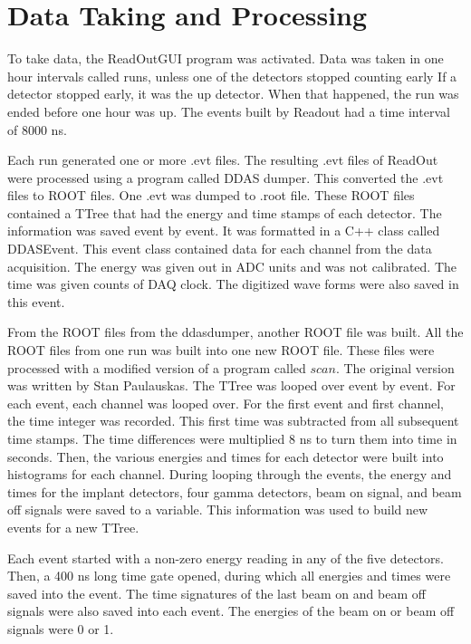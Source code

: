 \documentclass[main.tex]{subfiles}
\begin{document}
\section{Data Taking and Processing}
To take data, the ReadOutGUI program was activated. 
Data was taken in one hour intervals called runs, unless one of the detectors stopped counting early
If a detector stopped early, it was the up detector.
When that happened, the run was ended before one hour was up. 
The events built by Readout had a time interval of 8000 ns.

Each run generated one or more .evt files. 
The resulting .evt files of ReadOut were processed using a program called DDAS dumper.
This converted the .evt files to ROOT files.
One .evt was dumped to .root file. 
These ROOT files contained a TTree that had the energy and time stamps of each detector.
The information was saved event by event. 
It was formatted in a C++ class called DDASEvent. 
This event class contained data for each channel from the data acquisition.
The energy was given out in ADC units and was not calibrated.
The time was given counts of DAQ clock.
The digitized wave forms were also saved in this event. 

From the ROOT files from the ddasdumper, another ROOT file was built.
All the ROOT files from one run was built into one new ROOT file. 
These files were processed with a modified version of a program called $scan$.
The original version was written by Stan Paulauskas.
The TTree was looped over event by event.
For each event, each channel was looped over. 
For the first event and first channel, the time integer was recorded. 
This first time was subtracted from all subsequent time stamps.
The time differences were multiplied 8 ns to turn them into time in seconds. 
Then, the various energies and times for each detector were built into histograms for each channel. 
During looping through the events, the energy and times for the implant detectors, four gamma detectors, beam on signal, and beam off signals were saved to a variable.
This information was used to build new events for a new TTree.

Each event started with a non-zero energy reading in any of the five detectors.
Then, a 400 ns long time gate opened, during which all energies and times were saved into the event.
The time signatures of the last beam on and beam off signals were also saved into each event.
The energies of the beam on or beam off signals were 0 or 1.
\end{document}

